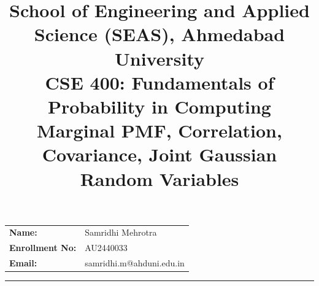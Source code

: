 \documentclass[12pt]{article}
\title{
    \normalsize School of Engineering and Applied Science (SEAS), Ahmedabad University \\
    \vspace{0.2cm}
    \textbf{CSE 400: Fundamentals of Probability in Computing}\\
    \Large {Marginal PMF, Correlation, Covariance, Joint Gaussian
Random Variables}
}
\author{}
\date{}
\begin{document}
\maketitle

\vspace{-2cm}
\begin{center}
    \begin{tabular}{ll}
        \textbf{Name:} & {Samridhi Mehrotra \hspace{2.5in}} \\ [1.5ex]
        \textbf{Enrollment No:} & {AU2440033 \hspace{2.5in}} \\ [1.5ex]
        \textbf{Email:} & {samridhi.m@ahduni.edu.in \hspace{2.1in}} \\ [1.5ex]
        
    \end{tabular}
\end{center}

\hrule
\vspace{0.5cm}
\end{document}
